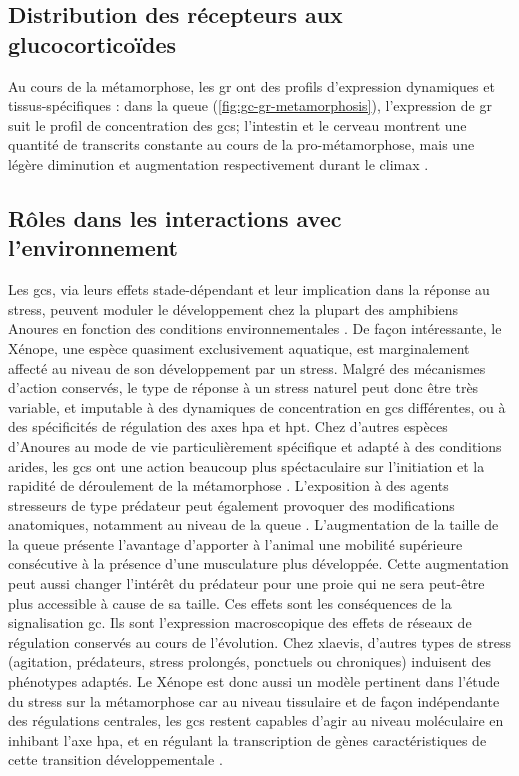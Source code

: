 \documentclass[../main.tex]{subfiles}
\begin{document}
\subsection{Distribution des récepteurs aux glucocorticoïdes}
Au cours de la métamorphose, les \gls{gr} ont des profils d'expression dynamiques et tissus-spécifiques :
dans la queue (\autoref{fig:gc-gr-metamorphosis}), l'expression de \gls{gr} suit le profil de concentration des \glspl{gc}; l'intestin et le cerveau montrent une quantité de transcrits constante au cours de la pro-métamorphose, mais une légère diminution et augmentation respectivement durant le climax \citep{Krain2004}.

\subsection{Rôles dans les interactions avec l'environnement}
Les \glspl{gc}, via leurs effets stade-dépendant et leur implication dans la réponse au stress, peuvent moduler le développement chez la plupart des amphibiens Anoures en fonction des conditions environnementales \citep{Denver2009}.
De façon intéressante, le Xénope, une espèce quasiment exclusivement aquatique, est marginalement affecté au niveau de son développement par un stress.
Malgré des mécanismes d'action conservés, le type de réponse à un stress naturel peut donc être très variable, et imputable à des dynamiques de concentration en \glspl{gc} différentes, ou à des spécificités de régulation des axes \gls{hpa} et \gls{hpt}.
Chez d'autres espèces d'Anoures au mode de vie particulièrement spécifique  et adapté à des conditions arides, les \glspl{gc} ont une action beaucoup plus spéctaculaire sur l'initiation et la rapidité de déroulement de la métamorphose \citep{Kulkarni2011,Gomez-Mestre2013a}.
L'exposition à des agents stresseurs de type prédateur peut également provoquer des modifications anatomiques, notamment au niveau de la queue \citep{Maher2013}.
L'augmentation de la taille de la queue présente l'avantage d'apporter à l'animal une mobilité supérieure consécutive à la présence d'une musculature plus développée. Cette augmentation peut aussi changer l'intérêt du prédateur pour une proie qui ne sera peut-être plus accessible à cause de sa taille.
Ces effets sont les conséquences de la signalisation \gls{gc}.
Ils sont l'expression macroscopique des effets de réseaux de régulation conservés au cours de l'évolution.
Chez \gls{xlaevis}, d'autres types de stress (agitation, prédateurs, stress prolongés, ponctuels ou chroniques) induisent des phénotypes adaptés.
Le Xénope est donc aussi un modèle pertinent dans l'étude du stress sur la métamorphose car au niveau tissulaire et de façon indépendante des régulations centrales, les \glspl{gc} restent capables d'agir au niveau moléculaire en inhibant l'axe \gls{hpa}, et en régulant la transcription de gènes caractéristiques de cette transition développementale \citep{Hu2008,Bonett2010}.
\end{document}
